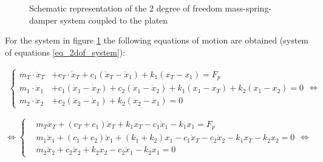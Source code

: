 \documentclass[10pt]{extarticle}
\begin{document}
\begin{figure}[H]
\caption{Schematic representation of the 2 degree of freedom mass-spring-damper system coupled to the platen}
\label{schematic_2dof}
\end{figure}


For the system in figure \ref{schematic_2dof} the following equations of motion are obtained (system of equations \ref{eq_2dof_system}):

\begin{align}\label{eq_2dof_system}
\left\{
\begin{aligned}
    m_T \cdot \ddot{x}_T &+ c_T \cdot \dot{x}_T + c_1 (\dot{x}_T -  \dot{x}_1) + k_1 (x_T - x_1) = F_p \\
    m_1 \cdot \ddot{x}_1 &+ c_1 ( \dot{x}_1 -\dot{x}_T) + c_2 ( \dot{x}_1 - \dot{x}_2) + k_1 (x_1 - x_T) + k_2 (x_1 - x_2) = 0 \\
    m_2 \cdot \ddot{x}_2 &+ c_2 ( \dot{x}_2 -\dot{x}_1) + k_2 (x_2 - x_1) = 0
\end{aligned}
\right. 
\Longleftrightarrow
\end{align}

\vspace{5mm}

\begin{equation*} 
\Longleftrightarrow
\left\{
\begin{aligned}
    &m_T  \ddot{x}_T + (c_T + c_1)  \dot{x}_T + k_1 x_T - c_1  \dot{x}_1 - k_1  x_1 = F_p \\
    &m_1  \ddot{x}_1 + (c_1 + c_2) \dot{x}_1 + (k_1 + k_2) x_1 - c_1  \dot{x}_T - c_2  \dot{x}_2 - k_1  x_T - k_2 x_2 = 0 \\
    &m_2  \ddot{x}_2 + c_2 \dot{x}_2 + k_2 x_2 - c_2  \dot{x}_1 - k_2 x_1 = 0
\end{aligned}
\right.
\Longleftrightarrow
\end{equation*}
\end{document}
